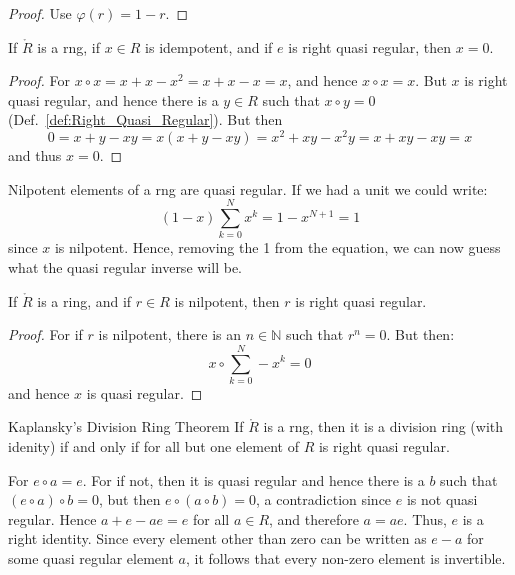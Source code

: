             \begin{proof}
                Use $\varphi(r)=1-r$.
            \end{proof}
            \begin{theorem}
                If $\ring{R}$ is a rng, if $x\in{R}$ is idempotent, and if
                $e$ is right quasi regular, then $x=0$.
            \end{theorem}
            \begin{proof}
                For $x\circ{x}=x+x-x^{2}=x+x-x=x$, and hence
                $x\circ{x}=x$. But $x$ is right quasi regular, and hence
                there is a $y\in{R}$ such that $x\circ{y}=0$
                (Def.~\ref{def:Right_Quasi_Regular}). But then
                \begin{equation}
                    0=x+y-xy=x(x+y-xy)=x^{2}+xy-x^{2}y=x+xy-xy=x
                \end{equation}
                and thus $x=0$.
            \end{proof}
            Nilpotent elements of a rng are quasi regular. If we had a unit
            we could write:
            \begin{equation}
                (1-x)\sum_{k=0}^{N}x^{k}=1-x^{N+1}=1
            \end{equation}
            since $x$ is nilpotent. Hence, removing the 1 from the equation,
            we can now guess what the quasi regular inverse will be.
            \begin{theorem}
                If $\ring{R}$ is a ring, and if $r\in{R}$ is nilpotent, then
                $r$ is right quasi regular.
            \end{theorem}
            \begin{proof}
                For if $r$ is nilpotent, there is an $n\in\mathbb{N}$ such
                that $r^{n}=0$. But then:
                \begin{equation}
                    x\circ\sum_{k=0}^{N}\minus{x}^{k}=0
                \end{equation}
                and hence $x$ is quasi regular.
            \end{proof}
            \begin{ftheorem}{Kaplansky's Division Ring Theorem}
                If $\ring{R}$ is a rng, then it is a division ring (with
                idenity) if and only if for all but one element of $R$ is
                right quasi regular.
            \end{ftheorem}
            \begin{bproof}
                For $e\circ{a}=e$. For if not, then it is quasi regular
                and hence there is a $b$ such that $(e\circ{a})\circ{b}=0$,
                but then $e\circ(a\circ{b})=0$, a contradiction since $e$ is
                not quasi regular. Hence $a+e-ae=e$ for all $a\in{R}$,
                and therefore $a=ae$. Thus, $e$ is a right identity. Since
                every element other than zero can be written as $e-a$ for
                some quasi regular element $a$, it follows that every
                non-zero element is invertible.
            \end{bproof}
